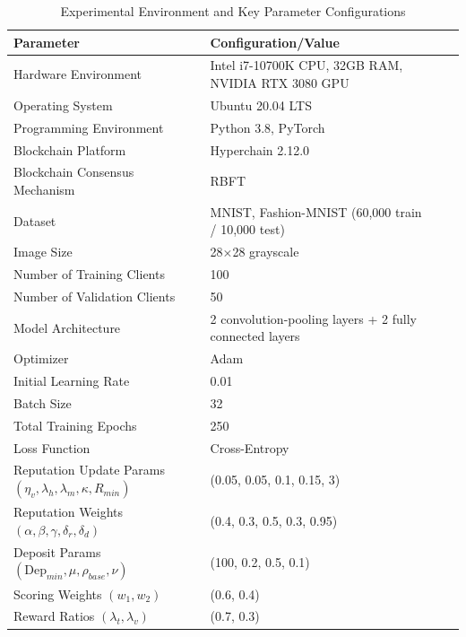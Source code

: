 \documentclass[a4paper]{cas-dc}
\begin{document}
\begin{table}[H]
	\begin{center}
		\caption{Experimental Environment and Key Parameter Configurations}
		\label{tb6}
		\setlength{\tabcolsep}{6pt}
		\begin{tabular*}{\textwidth}{@{\extracolsep{\fill}} llll}
			\toprule
			\textbf{Parameter} & \textbf{Configuration/Value} \\
			\midrule
			Hardware Environment & Intel i7-10700K CPU, 32GB RAM, NVIDIA RTX 3080 GPU \\
			Operating System & Ubuntu 20.04 LTS \\
			Programming Environment & Python 3.8, PyTorch \\
			Blockchain Platform & Hyperchain 2.12.0 \\
			Blockchain Consensus Mechanism & RBFT \\
			Dataset & MNIST, Fashion-MNIST (60,000 train / 10,000 test) \\
			Image Size & 28×28 grayscale \\
			Number of Training Clients & 100 \\
			Number of Validation Clients & 50 \\
			Model Architecture & 2 convolution-pooling layers + 2 fully connected layers \\
			Optimizer & Adam \\
			Initial Learning Rate & 0.01 \\
			Batch Size & 32 \\
			Total Training Epochs & 250 \\
			Loss Function & Cross-Entropy \\
            Reputation Update Params $(\eta_v, \lambda_h, \lambda_m, \kappa, R_{min})$ & (0.05, 0.05, 0.1, 0.15, 3) \\
            Reputation Weights $(\alpha, \beta, \gamma, \delta_r, \delta_d)$ & (0.4, 0.3, 0.5, 0.3, 0.95) \\
			Deposit Params $(\mathrm{Dep}_{min}, \mu, \rho_{base}, \nu)$ & (100, 0.2, 0.5, 0.1)\\
			Scoring Weights $(w_1, w_2)$ & (0.6, 0.4) \\
            Reward Ratios $(\lambda_t, \lambda_v)$ & (0.7, 0.3) \\
            \bottomrule
		\end{tabular*}
	\end{center}
\end{table}
\end{document}
